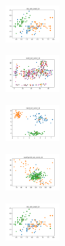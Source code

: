 \begin{figure}[H]    
    \centering
    \begin{subfigure}
        \centering
        \includegraphics[width=0.234\textwidth]{img/hs-ls-v2/iris_set_const_10_949004259_clust.png}
    \end{subfigure}
    \hfill
    \begin{subfigure}
        \centering
        \includegraphics[width=0.234\textwidth]{img/hs-ls-v2/ecoli_set_const_10_949004259_clust.png}
    \end{subfigure}
    \hfill
    \begin{subfigure}
        \centering
        \includegraphics[width=0.234\textwidth]{img/hs-ls-v2/rand_set_const_10_949004259_clust.png}
    \end{subfigure}
    \hfill
    \begin{subfigure}
        \centering
        \includegraphics[width=0.234\textwidth]{img/hs-ls-v2/newthyroid_set_const_10_949004259_clust.png}
    \end{subfigure}
    \hfill
    \begin{subfigure}
        \centering
        \includegraphics[width=0.234\textwidth]{img/hs-ls-v2/iris_set_const_10_589741062_clust.png}
    \end{subfigure}

\end{figure}
